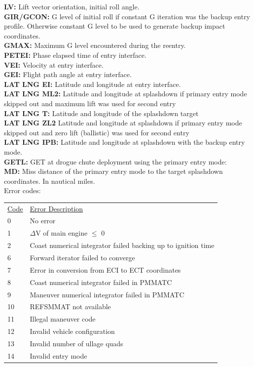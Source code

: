 \documentclass[11pt]{article} %
\begin{document}
\textbf{LV:} Lift vector orientation, initial roll angle.\\
\textbf{GIR/GCON:} G level of initial roll if constant G iteration was the backup entry profile. Otherwise constant G level to be used to generate backup impact coordinates.\\
\textbf{GMAX:} Maximum G level encountered during the reentry.\\
\textbf{PETEI:} Phase elapsed time of entry interface.\\
\textbf{VEI:} Velocity at entry interface.\\
\textbf{GEI:} Flight path angle at entry interface.\\  
\textbf{LAT LNG EI:} Latitude and longitude at entry interface.\\
\textbf{LAT LNG ML2:} Latitude and longitude at splashdown if primary entry mode skipped out and maximum lift was used for second entry\\
\textbf{LAT LNG T:} Latitude and longitude of the splashdown target\\
\textbf{LAT LNG ZL2} Latitude and longitude at splashdown if primary entry mode skipped out and zero lift (ballistic) was used for second entry\\
\textbf{LAT LNG IPB:} Latitude and longitude at splashdown with the backup entry mode.\\
\textbf{GETL:} GET at drogue chute deployment using the primary entry mode:\\
\textbf{MD:} Miss distance of the primary entry mode to the target splashdown coordinates. In nautical miles.\\

Error codes:\\

\begin{tabular}{p{3cm} p{10cm}}
\underline{Code}&\underline{Error Description}\\
0&No error\\
1&$\Delta$V of main engine $\le$ 0\\
2&Coast numerical integrator failed backing up to ignition time\\
6&Forward iterator failed to converge\\
7&Error in conversion from ECI to ECT coordinates\\
8&Coast numerical integrator failed in PMMATC\\
9&Maneuver numerical integrator failed in PMMATC\\
10&REFSMMAT not available\\
11&Illegal maneuver code\\
12&Invalid vehicle configuration\\
13&Invalid number of ullage quads\\
14&Invalid entry mode\\
\end{tabular}
\newpage
\end{document}
